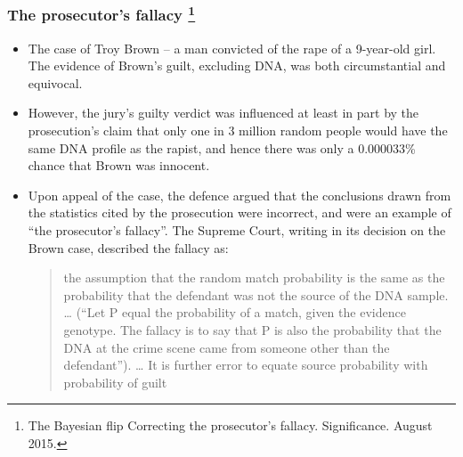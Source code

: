 \documentclass[10pt,handout]{beamer}\usepackage[]{graphicx}\usepackage[]{color}
\begin{document}
\begin{frame}
	\frametitle{The prosecutor's fallacy \footnote{\tiny{The Bayesian flip
Correcting the prosecutor's fallacy. Significance. August 2015.}}}
	
	\begin{itemize}
		\setlength\itemsep{1em}
		\item The case of Troy Brown – a man
convicted of the rape of a 9-year-old girl. The
evidence of Brown's guilt, excluding DNA,
was both circumstantial and equivocal.
		\item However, the jury's guilty verdict was influenced at least in part by the prosecution's
claim that only one in 3 million random
people would have the same DNA profile
as the rapist, and hence there was only a
		0.000033\% chance that Brown was innocent. \pause
		\item Upon appeal of the case, the defence
argued that the conclusions drawn from
the statistics cited by the prosecution were
incorrect, and were an example of ``the prosecutor's fallacy''. The Supreme Court,
writing in its decision on the Brown case,
described the fallacy as:
		\begin{quote}
		the assumption that the random match
probability is the same as the probability
that the defendant was not the source
of the DNA sample. … (“Let P equal
the probability of a match, given the evidence genotype. The fallacy is to say that
P is also the probability that the DNA at
the crime scene came from someone other than the defendant”). … It is further
error to equate source probability with
probability of guilt
		\end{quote}
	\end{itemize}
	
\end{frame}
\end{document}
